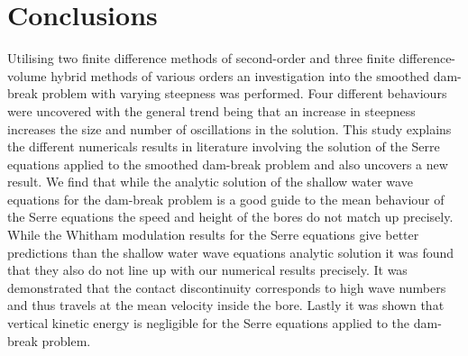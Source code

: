 \documentclass[times]{elsarticle}
\begin{document}
\section{Conclusions}
\label{section:Conclusions}
Utilising two finite difference methods of second-order and three finite difference-volume hybrid methods of various orders an investigation into the smoothed dam-break problem with varying steepness was performed. Four different behaviours were uncovered with the general trend being that an increase in steepness increases the size and number of oscillations in the solution. This study explains the different numericals results in literature involving the solution of the Serre equations applied to the smoothed dam-break problem and also uncovers a new result. We find that while the analytic solution of the shallow water wave equations for the dam-break problem is a good guide to the mean behaviour of the Serre equations the speed and height of the bores do not match up precisely. While the Whitham modulation results for the Serre equations give better predictions than the shallow water wave equations analytic solution it was found that they also do not line up with our numerical results precisely. It was demonstrated that the contact discontinuity corresponds to high wave numbers and thus travels at the mean velocity inside the bore. Lastly it was shown that vertical kinetic energy is negligible for the Serre equations applied to the dam-break problem. 





\end{document}
